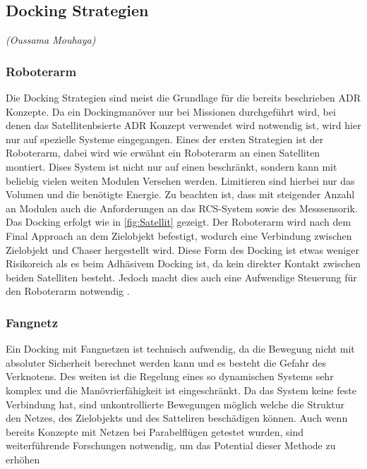 		\subsection{Docking Strategien}
			\hfill\emph{(Oussama Mouhaya)}

\subsubsection{Roboterarm}

	Die Docking Strategien sind meist die Grundlage für die bereits beschrieben ADR Konzepte.	Da ein Dockingmanöver nur bei  Missionen durchgeführt wird, bei denen das Satellitenbsierte ADR Konzept verwendet wird notwendig ist, wird hier nur auf spezielle Systeme eingegangen. Eines der ersten Strategien ist der Roboterarm, dabei wird wie erwähnt ein Roboterarm an einen Satelliten montiert. Dises System ist nicht nur auf einen beschränkt, sondern kann mit beliebig vielen weiten Modulen Versehen werden. Limitieren sind hierbei nur das Volumen und die benötigte Energie. Zu beachten ist, dass mit steigender Anzahl an Modulen auch die Anforderungen an das RCS-System sowie des Messsensorik. Das Docking erfolgt wie in \ref{fig:Satellit} gezeigt. Der Roboterarm wird nach dem Final Approach an dem Zielobjekt befestigt, wodurch eine Verbindung zwischen Zielobjekt und Chaser hergestellt wird. Diese Form des Docking ist etwas weniger Risikoreich als es beim Adhäsivem Docking ist, da kein direkter Kontakt zwischen beiden Satelliten besteht. Jedoch macht dies auch eine Aufwendige Steuerung für den Roboterarm notwendig \cite{Castronuovo.2011}.

\subsubsection{Fangnetz}

	Ein Docking mit Fangnetzen ist technisch aufwendig, da die Bewegung nicht mit absoluter Sicherheit berechnet werden kann und es besteht die Gefahr des Verknotens. Des weiten ist die Regelung eines so dynamischen Systems sehr komplex und die Manövrierfähigkeit ist eingeschränkt. Da das System keine feste Verbindung hat, sind unkontrollierte Bewegungen möglich welche die Struktur den Netzes, des Zielobjekts und des Satteliren beschädigen können. Auch wenn bereits Konzepte mit Netzen bei Parabelflügen getestet wurden, sind weiterführende  Forschungen notwendig, um das Potential dieser Methode zu erhöhen


